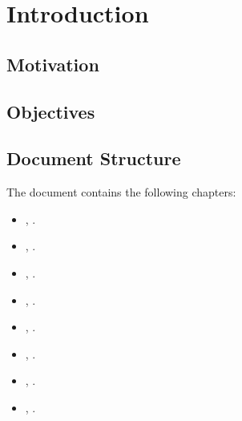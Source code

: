 \chapter{Introduction}\label{chap:introduction}
\section{Motivation}\label{sec:motivation}



\section{Objectives}\label{sec:objectives}

\section{Document Structure}\label{sec:structure}
The document contains the following chapters:
\begin{itemize}
  \item {}, .
  \item {}, .
  \item {}, .
  \item {}, .
  \item {}, .
  \item {}, .
  \item {}, .
  \item {}, .
\end{itemize}
